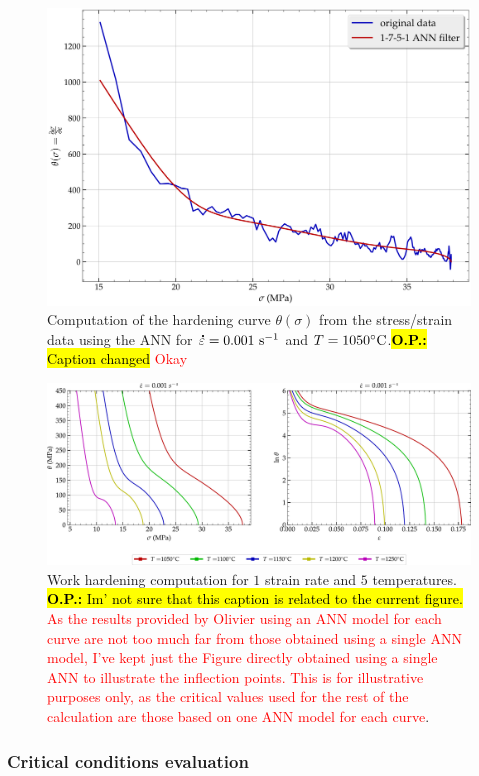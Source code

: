 \documentclass[metals,article,submit,pdftex,moreauthors]{Definitions/mdpi}
\DeclareRobustCommand{\mdot}[1]{\accentset{\mbox{\bfseries .}}{#1}}
\DeclareRobustCommand{\ps}{\text{s}^{-1}}
\DeclareRobustCommand{\OP}[1]{\begingroup\sethlcolor{VWyellow}\textcolor{red}{\hl{\textbf{O.P.:} #1}}\endgroup}
\begin{document}
\begin{figure}[H]
\centering
\includegraphics[width=0.7\columnwidth]{Figures/AnnTheta}
\caption{Computation of the hardening curve $\theta(\sigma)$ from the stress/strain data using the ANN for $\mdot\varepsilon=0.001~\ps$ and $T=1050\celsius$.\OP{Caption changed} \textcolor{red}{Okay}}
\label{fig:AnnTheta}
\end{figure}

\begin{figure}[H]
\centering
\includegraphics[width=0.99\columnwidth]{Figures/nThetaOP}
\caption{Work hardening computation for $1$ strain rate and $5$ temperatures. \OP{Im' not sure that this caption is related to the current figure.} \textcolor{red}{As the results provided by Olivier using an ANN model for each curve are not too much far from those obtained using a single ANN model, I've kept just the Figure directly obtained using a single ANN to illustrate the inflection points. This is for illustrative purposes only, as the critical values used for the rest of the calculation are those based on one ANN model for each curve}.}
\label{fig:nThetaOP}
\end{figure}

\subsubsection{Critical conditions evaluation\label{subsec:CrConditions}}
\end{document}
